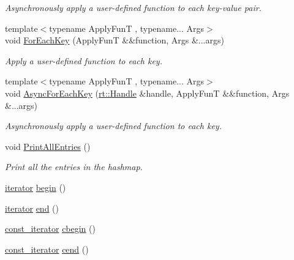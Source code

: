 \begin{DoxyCompactItemize}
$$\begin{DoxyCompactList}\small\item\em Asynchronously apply a user-\/defined function to each key-\/value pair. \end{DoxyCompactList}\item 
{\footnotesize template$<$typename Apply\-Fun\-T , typename... Args$>$ }\\void \hyperlink{classshad_1_1LocalHashmap_af8308e042d3b4a435517404ca4679d82}{For\-Each\-Key} (Apply\-Fun\-T \&\&function, Args \&...args)
\begin{DoxyCompactList}\small\item\em Apply a user-\/defined function to each key. \end{DoxyCompactList}\item 
{\footnotesize template$<$typename Apply\-Fun\-T , typename... Args$>$ }\\void \hyperlink{classshad_1_1LocalHashmap_a559f24258bb798fdfafbb28fc70ccbd8}{Async\-For\-Each\-Key} (\hyperlink{classshad_1_1rt_1_1Handle}{rt\-::\-Handle} \&handle, Apply\-Fun\-T \&\&function, Args \&...args)
\begin{DoxyCompactList}\small\item\em Asynchronously apply a user-\/defined function to each key. \end{DoxyCompactList}\item 
void \hyperlink{classshad_1_1LocalHashmap_a7dc7ac304876af70108a24c7b82d408e}{Print\-All\-Entries} ()
\begin{DoxyCompactList}\small\item\em Print all the entries in the hashmap. \end{DoxyCompactList}\item 
\hyperlink{classshad_1_1LocalHashmap_a130dbe16edd42ee7aa2e27eac6ee3cf4}{iterator} \hyperlink{classshad_1_1LocalHashmap_ad84d91d8fd4448a2017b39480c842984}{begin} ()
\item 
\hyperlink{classshad_1_1LocalHashmap_a130dbe16edd42ee7aa2e27eac6ee3cf4}{iterator} \hyperlink{classshad_1_1LocalHashmap_a6171d13fb3d6d493068e23cd166e8929}{end} ()
\item 
\hyperlink{classshad_1_1LocalHashmap_ad5e054bdbc20f161cd8df8e00c525401}{const\-\_\-iterator} \hyperlink{classshad_1_1LocalHashmap_a9cc4e9135d4808fbf53f253755744019}{cbegin} ()
\item 
\hyperlink{classshad_1_1LocalHashmap_ad5e054bdbc20f161cd8df8e00c525401}{const\-\_\-iterator} \hyperlink{classshad_1_1LocalHashmap_a18da968a5c684f5b4abbdd0bf6760574}{cend} ()
\end{DoxyCompactItemize}
